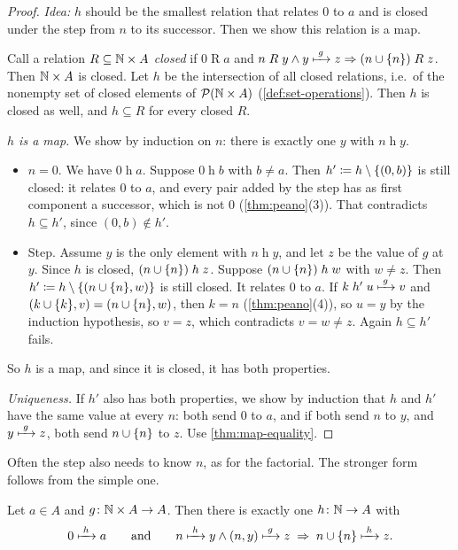 \begin{proof}
\emph{Idea:} $h$ should be the smallest relation that relates $0$ to $a$ and is
closed under the step from $n$ to its successor. Then we show this relation is a
map.

Call a relation $R \subseteq \mathbb{N} \times A$ \emph{closed} if $0 \mathrel{R} a$ and $n
\mathrel{R} y \land y \xmapsto{\;g\;} z \Rightarrow (n \cup \lbrace n \rbrace) \mathrel{R} z$. Then
$\mathbb{N} \times A$ is closed. Let $h$ be the intersection of all closed relations,
i.e.\ of the nonempty set of closed elements of $\mathcal{P} (\mathbb{N} \times A)$
(\cref{def:set-operations}). Then $h$ is closed as well, and $h \subseteq R$ for
every closed $R$.

\emph{$h$ is a map.} We show by induction on $n$: there is exactly one $y$ with $n
\mathrel{h} y$.
\begin{itemize}
  \item $n = 0$. We have $0 \mathrel{h} a$. Suppose $0 \mathrel{h} b$ with $b \neq
    a$. Then $h' \coloneqq h \setminus \lbrace (0, b) \rbrace$ is still closed: it relates $0$
    to $a$, and every pair added by the step has as first component a successor,
    which is not $0$ (\cref{thm:peano}(3)). That contradicts $h \subseteq h'$,
    since $(0, b) \notin h'$.
  \item Step. Assume $y$ is the only element with $n \mathrel{h} y$, and let $z$ be
    the value of $g$ at $y$. Since $h$ is closed, $(n \cup \lbrace n \rbrace) \mathrel{h} z$.
    Suppose $(n \cup \lbrace n \rbrace) \mathrel{h} w$ with $w \neq z$. Then $h' \coloneqq h
    \setminus \lbrace (n \cup \lbrace n \rbrace, w) \rbrace$ is still closed. It relates $0$ to $a$.
    If $k \mathrel{h'} u \xmapsto{\;g\;} v$ and $(k \cup \lbrace k \rbrace, v) = (n \cup \lbrace n \rbrace,
    w)$, then $k = n$ (\cref{thm:peano}(4)), so $u = y$ by the induction
    hypothesis, so $v = z$, which contradicts $v = w \neq z$. Again $h \subseteq h'$
    fails.
\end{itemize}
So $h$ is a map, and since it is closed, it has both properties.

\emph{Uniqueness.} If $h'$ also has both properties, we show by induction that $h$
and $h'$ have the same value at every $n$: both send $0$ to $a$, and if both send
$n$ to $y$, and $y \xmapsto{\;g\;} z$, both send $n \cup \lbrace n \rbrace$ to $z$. Use
\cref{thm:map-equality}.
\end{proof}

Often the step also needs to know $n$, as for the factorial. The stronger form
follows from the simple one.

\begin{corollary}
\label{cor:recursion-index}
Let $a \in A$ and $g \colon \mathbb{N} \times A \to A$. Then there is exactly one $h \colon
\mathbb{N} \to A$ with
\[
  0 \xmapsto{\;h\;} a \qquad\text{and}\qquad n \xmapsto{\;h\;} y \land (n, y) \xmapsto{\;g\;} z
  \;\Rightarrow\; n \cup \lbrace n \rbrace \xmapsto{\;h\;} z.
\]
\end{corollary}

